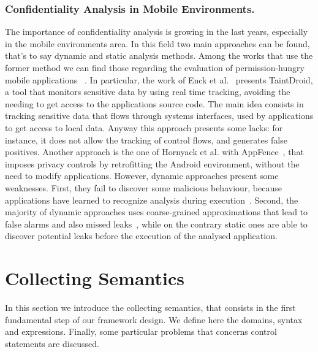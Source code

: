 \documentclass{llncs}
\begin{document}
\subsubsection{Confidentiality Analysis in Mobile Environments.}
The importance of confidentiality analysis is growing in the last years, especially in the mobile environments area. In this field two main approaches can be found, that's to say dynamic and static analysis methods. Among the works that use the former method we can find those regarding the evaluation of permission-hungry mobile applications ~\cite{TUD-CS-2014-0849, Arzt:2014:FPC:2666356.2594299}. In particular, the work of Enck et al.~\cite{Enck:2014:TIT:2642648.2619091} presents TaintDroid, a tool that monitors sensitive data by using real time tracking, avoiding the needing to get access to the applications source code. The main idea consists in tracking sensitive data that flows through systems interfaces, used by applications to get access to local data. Anyway this approach presents some lacks: for instance, it does not allow the tracking of control flows, and generates false positives. Another approach is the one of Hornyack et al. with AppFence~\cite{Hornyack:2011:TAD:2046707.2046780}, that imposes privacy controls by retrofitting the Android environment, without the need to modify applications.
However, dynamic approaches present some weaknesses. First, they fail to discover some malicious behaviour, because applications have learned to recognize analysis during execution~\cite{fritz2013highly}. Second, the majority of dynamic approaches uses coarse-grained approximations that lead to false alarms and also missed leaks~\cite{Arzt:2014:FPC:2666356.2594299}, while on the contrary static ones are able to discover potential leaks before the execution of the analysed application.


\section{Collecting Semantics}

In this section we introduce the collecting semantics, that consists in the first fundamental step of our framework design. We define here the domains, syntax and expressions. Finally, some particular problems that concerns control statements are discussed.
\end{document}
